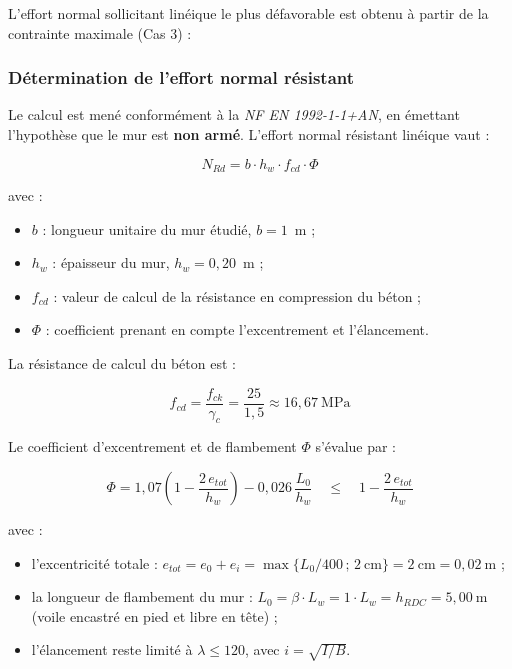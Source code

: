 L'effort normal sollicitant linéique le plus défavorable est obtenu à partir de la contrainte maximale (Cas 3) :


\subsubsection{Détermination de l'effort normal résistant}

Le calcul est mené conformément à la \textit{NF EN 1992-1-1+AN}, en émettant l'hypothèse que le mur est \textbf{non armé}. L'effort normal résistant linéique vaut :

\[
N_{Rd} = b \cdot h_w \cdot f_{cd} \cdot \Phi
\]

avec :
\begin{itemize}
  \item $b$ : longueur unitaire du mur étudié, $b = 1$~m ;
  \item $h_w$ : épaisseur du mur, $h_w = 0{,}20$~m ;
  \item $f_{cd}$ : valeur de calcul de la résistance en compression du béton ;
  \item $\Phi$ : coefficient prenant en compte l'excentrement et l'élancement.
\end{itemize}

La résistance de calcul du béton est :

\[
f_{cd} = \frac{f_{ck}}{\gamma_c} = \frac{25}{1{,}5} \approx 16{,}67~\text{MPa}
\]

Le coefficient d'excentrement et de flambement $\Phi$ s'évalue par :

\[
\Phi = 1{,}07 \left(1 - \frac{2 \, e_{tot}}{h_w}\right) - 0{,}026 \, \frac{L_0}{h_w} \quad \leq \quad 1 - \frac{2 \, e_{tot}}{h_w}
\]

avec :
\begin{itemize}
  \item l'excentricité totale : $e_{tot} = e_0 + e_i = \max\{L_0/400 \, ; \, 2~\text{cm}\} = 2~\text{cm} = 0{,}02~\text{m}$ ;
  \item la longueur de flambement du mur : $L_0 = \beta \cdot L_w = 1 \cdot L_w = h_{RDC} = 5{,}00~\text{m}$ (voile encastré en pied et libre en tête) ;
  \item l'élancement reste limité à $\lambda \leq 120$, avec $i = \sqrt{I/B}$.
\end{itemize}

